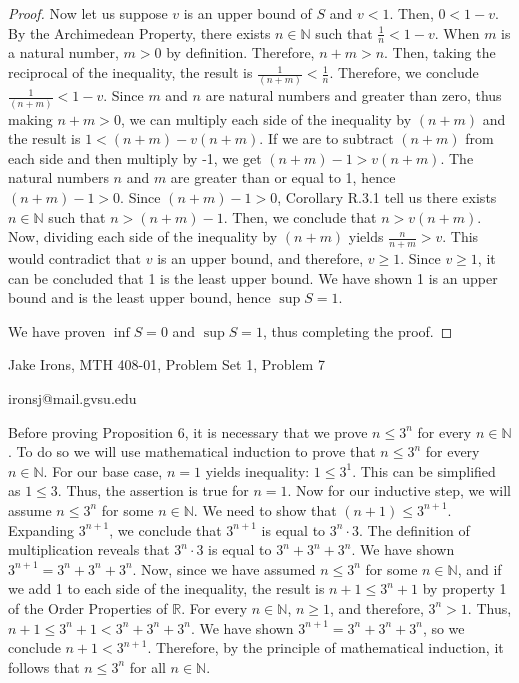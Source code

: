 \documentclass[11 pt]{article}
\newcommand{\newpar}{\vspace{.15in}\noindent}
\begin{document}
\begin{proof}
\newpar
Now let us suppose $v$ is an upper bound of $S$ and $v<1$. Then, $0<1-v$. By the Archimedean Property, there exists $n\in\mathbb{N}$ such that $\frac{1}{n}<1-v$. When $m$ is a natural number, $m>0$ by definition. Therefore, $n+m>n$. Then, taking the reciprocal of the inequality, the result is $\frac{1}{(n+m)}<\frac{1}{n}$. Therefore, we conclude $\frac{1}{(n+m)}<1-v$. Since $m$ and $n$ are natural numbers and greater than zero, thus making $n+m>0$, we can multiply each side of the inequality by $(n+m)$ and the result is $1<(n+m)-v(n+m)$. If we are to subtract $(n+m)$ from each side and then multiply by -1, we get $(n+m)-1>v(n+m)$. The natural numbers $n$ and $m$ are greater than or equal to 1, hence $(n+m)-1>0$. Since $(n+m)-1>0$, Corollary R.3.1 tell us there exists $n\in\mathbb{N}$ such that $n>(n+m)-1$. Then, we conclude that $n>v(n+m)$. Now, dividing each side of the inequality by $(n+m)$ yields $\frac{n}{n+m}>v$. This would contradict that $v$ is an upper bound, and therefore, $v\ge1$. Since $v\ge1$, it can be concluded that 1 is the least upper bound. We have shown 1 is an upper bound and is the least upper bound, hence $\sup{S}=1$.

\newpar
We have proven $\inf{S}=0$ and $\sup{S}=1$, thus completing the proof.
\end{proof}
\newpage
\noindent Jake Irons, MTH 408-01, Problem Set 1, Problem 7

\noindent ironsj@mail.gvsu.edu

\newpar
 Before proving Proposition 6, it is necessary that we prove $n\le3^n$ for every $n\in\mathbb{N}$. To do so we will use mathematical induction to prove that $n\le3^n$ for every $n\in \mathbb{N}$. For our base case, $n=1$ yields inequality: $1\le3^1$. This can be simplified as $1\le3$. Thus, the assertion is true for $n=1$. Now for our inductive step, we will assume $n\le3^n$ for some $n\in\mathbb{N}$. We need to show that $(n+1)\le3^{n+1}$. Expanding $3^{n+1}$, we conclude that $3^{n+1}$ is equal to $3^n\cdot3$. The definition of multiplication reveals that $3^n\cdot3$ is equal to $3^n+3^n+3^n$. We have shown $3^{n+1}=3^n+3^n+3^n$. Now, since we have assumed $n\le3^n$ for some $n\in\mathbb{N}$, and if we add 1 to each side of the inequality, the result is $n+1\le3^n+1$ by property 1 of the Order Properties of $\mathbb{R}$. For every $n\in\mathbb{N}$, $n\ge1$, and therefore, $3^n>1$. Thus, $n+1\le3^n+1<3^n+3^n+3^n$. We have shown $3^{n+1}=3^n+3^n+3^n$, so we conclude $n+1<3^{n+1}$. Therefore, by the principle of mathematical induction, it follows that $n\le3^n$ for all $n\in\mathbb{N}$.
\end{document}
